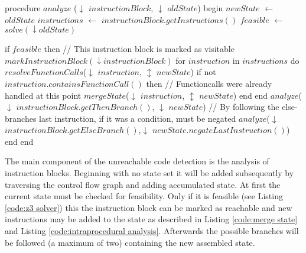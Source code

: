 \begin{program}
	\begin{GenericCode}
procedure $analyze$ ($\downarrow$ $instructionBlock$, $\downarrow$ $oldState$) begin
	$newState$ $\leftarrow$ $oldState$
	$instructions$ $\leftarrow$ $instructionBlock.getInstructions()$
	$feasible$ $\leftarrow$ $solve(\downarrow oldState)$
		
	if $feasible$ then
		// This instruction block is marked as visitable
		$markInstructionBlock(\downarrow instructionBlock)$ 
		for $instruction$ in $instructions$ do
			$resolveFunctionCalls$($\downarrow$ $instruction$, $\updownarrow$ $newState$)	
			if not $instruction.containsFunctionCall()$ then
				// Functioncalls were already handled at this point
				$mergeState$($\downarrow$ $instruction$, $\updownarrow$ $newState$)
			end 
		end
		$analyze$($\downarrow$ $instructionBlock.getThenBranch()$, $\downarrow$ $newState$)
		// By following the else-branches last instruction, if it was a condition, must be negated
		$analyze$($\downarrow$ $instructionBlock.getElseBranch()$,$\downarrow$ $newState.negateLastInstruction()$)
	end
end	\end{GenericCode}

	\caption{The main component of the unreachable code detection is the analysis of instruction blocks. Beginning with no state set it will be added subsequently by traversing the control flow graph and adding accumulated state. 
	At first the current state must be checked for feasibility. Only if it is feasible (see Listing \ref{code:z3 solver}) this the instruction block can be marked as reachable and new instructions may be added to the state as described in Listing \ref{code:merge state} and Listing \ref{code:intraprocedural analysis}.	
	Afterwards the possible branches will be followed (a maximum of two) containing the new assembled state.}
	\label{code:instruction block analyzer}
\end{program}


